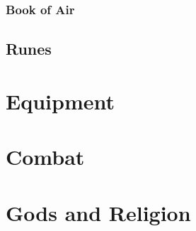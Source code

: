 \documentclass[12pt]{article}
\begin{document}
\subsubsection{Book of Air}
\subsection{Runes}
\section{Equipment}
\section{Combat}
\section{Gods and Religion}











\newpage
\printindex
\end{document}
